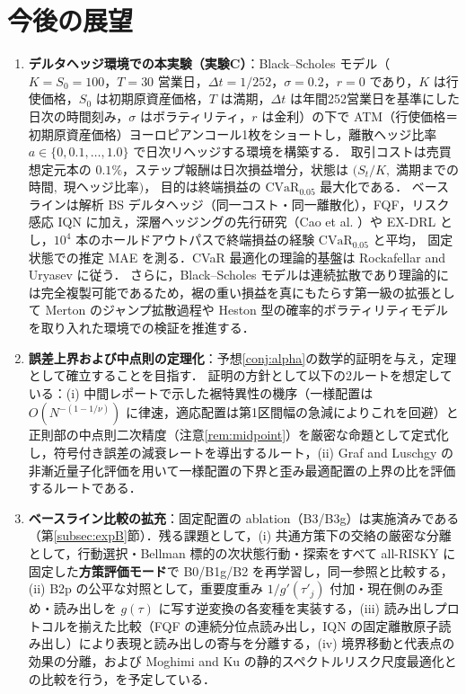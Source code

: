 \documentclass[a4paper,10pt]{jsarticle}
\theoremstyle{definition}
\newcommand{\CVaR}{\mathrm{CVaR}}
\begin{document}
\section{今後の展望}
\label{sec:future}
\begin{enumerate}
  \item \textbf{デルタヘッジ環境での本実験（実験C）}：Black--Scholes モデル（$K=S_0=100$，$T=30$ 営業日，$\Delta t=1/252$，$\sigma=0.2$，$r=0$ であり，$K$ は行使価格，$S_0$ は初期原資産価格，$T$ は満期，$\Delta t$ は年間252営業日を基準にした日次の時間刻み，$\sigma$ はボラティリティ，$r$ は金利）の下で
  ATM（行使価格＝初期原資産価格）ヨーロピアンコール1枚をショートし，離散ヘッジ比率 $a\in\{0,0.1,\dots,1.0\}$ で日次リヘッジする環境を構築する．
  取引コストは売買想定元本の $0.1\%$，ステップ報酬は日次損益増分，状態は $(S_t/K,$ 満期までの時間$,$ 現ヘッジ比率$)$，
  目的は終端損益の $\CVaR_{0.05}$ 最大化である．
  ベースラインは解析 BS デルタヘッジ（同一コスト・同一離散化），FQF，リスク感応 IQN に加え，深層ヘッジングの先行研究（Cao et al. \cite{cao2021deep,cao2023gamma}）や EX-DRL \cite{malekzadeh2024exdrl} とし，$10^4$ 本のホールドアウトパスで終端損益の経験 $\CVaR_{0.05}$ と平均，
  固定状態での推定 MAE を測る．CVaR 最適化の理論的基盤は Rockafellar and Uryasev \cite{rockafellar2000cvar} に従う．
  さらに，Black--Scholes モデルは連続拡散であり理論的には完全複製可能であるため，裾の重い損益を真にもたらす第一級の拡張として Merton のジャンプ拡散過程や Heston 型の確率的ボラティリティモデルを取り入れた環境での検証を推進する．
  \item \textbf{誤差上界および中点則の定理化}：予想\ref{conj:alpha}の数学的証明を与え，定理として確立することを目指す．
  証明の方針として以下の2ルートを想定している：(i) 中間レポートで示した裾特異性の機序（一様配置は $O(N^{-(1-1/\nu)})$ に律速，適応配置は第1区間幅の急減によりこれを回避）と正則部の中点則二次精度（注意\ref{rem:midpoint}）を厳密な命題として定式化し，符号付き誤差の減衰レートを導出するルート，(ii) Graf and Luschgy \cite{graf2000quantization} の非漸近量子化評価を用いて一様配置の下界と歪み最適配置の上界の比を評価するルートである．
  \item \textbf{ベースライン比較の拡充}：固定配置の ablation（B3/B3g）は実施済みである（第\ref{subsec:expB}節）．残る課題として，(i) 共通方策下の交絡の厳密な分離として，行動選択・Bellman 標的の次状態行動・探索をすべて all-RISKY に固定した\textbf{方策評価モード}で B0/B1g/B2 を再学習し，同一参照と比較する，(ii) B2p の公平な対照として，重要度重み $1/g'(\tau'_j)$ 付加・現在側のみ歪め・読み出しを $g(\tau)$ に写す逆変換の各変種を実装する，(iii) 読み出しプロトコルを揃えた比較（FQF の連続分位点読み出し，IQN の固定離散原子読み出し）により表現と読み出しの寄与を分離する，(iv) 境界移動と代表点の効果の分離，および Moghimi and Ku \cite{moghimi2025beyond} の静的スペクトルリスク尺度最適化との比較を行う，を予定している．

\end{enumerate}
\end{document}
